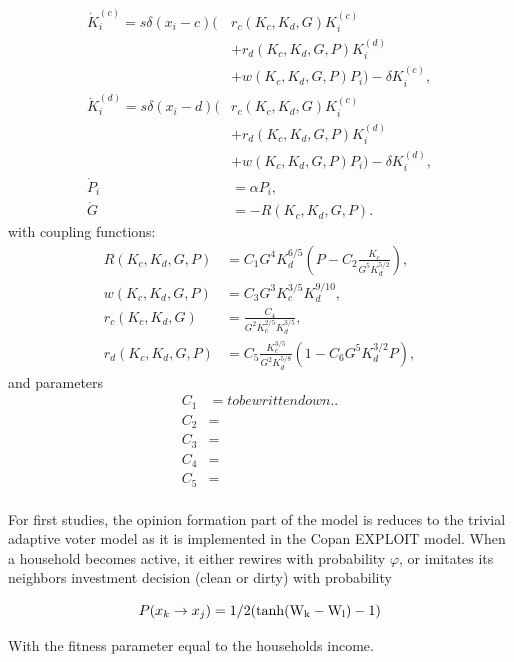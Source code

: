 \begin{align}
	\dot{K}_i^{(c)} = s \delta(x_i - c) \bigg(&  r_c(K_c, K_d, G)  K_i^{(c)} \nonumber \\
	&+ r_d(K_c, K_d, G, P) K_i^{(d)} \nonumber \\ 
	&+w(K_c, K_d, G, P)  P_i \bigg) - \delta K_i^{(c)}, \\
	\dot{K}_i^{(d)} = s \delta(x_i - d) \bigg(&  r_c(K_c, K_d, G)  K_i^{(c)} \nonumber \\
	&+ r_d(K_c, K_d, G, P) K_i^{(d)} \nonumber \\ 
	&+  w(K_c, K_d, G, P) P_i \bigg) - \delta K_i^{(d)}, \\
	\dot{P}_i &= \alpha P_i, \nonumber \\
	\dot{G} &= - R(K_c, K_d, G, P) .
\end{align}
with coupling functions:
\begin{align}
	R(K_c, K_d, G, P) &= C_1G^4 K_d^{6/5}\left( P - C_2 \frac{K_c}{G^5K_d^{5/2}} \right), \\
	w(K_c, K_d, G, P) &= C_3 G^3 K_c^{3/5}K_d^{9/10} , \\
	r_c(K_c, K_d, G) \quad &= \frac{C_4}{G^2 K_c^{2/5}K_d^{3/5}} , \\
	r_d(K_c, K_d, G, P) &= C_5 \frac{K_c^{3/5}}{G^2 K_d^{5/8}} \left( 1-C_6 G^5 K_d^{3/2} P \right) ,
	\label{final_rates_and_wages}
\end{align}
and parameters
\begin{align}
	C_1 &= to be written down..\nonumber \\
	C_2 &= \nonumber \\
	C_3 &= \nonumber \\
	C_4 &= \nonumber \\
	C_5 &= \nonumber \\
\end{align}

For first studies, the opinion formation part of the model is reduces to the trivial adaptive voter model as it is implemented in the Copan EXPLOIT model. When a household becomes active, it either rewires with probability $\varphi$, or imitates its neighbors investment decision (clean or dirty) with probability 

\begin{equation}
	P(x_k \rightarrow x_j) = 1/2 (\rm{tanh}(W_k - W_l)-1)
	\label{primitive_imitation_probability}
\end{equation}

With the fitness parameter equal to the households income.

